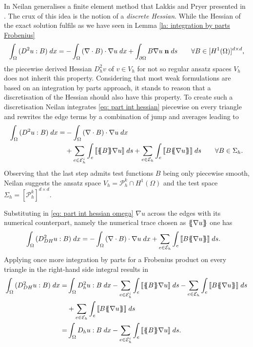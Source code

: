 In \cite{Neilan2014} Neilan generalises a finite element method that Lakkis and Pryer presented in \cite{LP2011}.
The crux of this idea is the notion of a \emph{discrete Hessian}. 
While the Hessian of the exact solution fulfils as we have seen in Lemma \ref{la: integration by parts Frobenius}
	\begin{align}
		\int_{\Omega} {{ (D^2 u : B)}\;dx} = 
			- \int_{\Omega} {{ \left(\nabla \cdot B\right) \cdot \nabla u}\;dx} 
			+ \int_{\partial \Omega} {{B \nabla u \; \mathbf {n}}\;ds} \qquad \forall B \in [H^1(\Omega)]^{d \times d}, \label{eq: part int hessian}
	\end{align}
the piecewise derived Hessian $D_h^2 v$ of $ v \in V_h$ for not so regular ansatz spaces $V_h$ does not inherit this property. Considering that most weak formulations are based on an integration by parts approach, it stands to reason that a discretisation of the Hessian should also have this property. To create such a discretisation Neilan integrates \eqref{eq: part int hessian} piecewise on every triangle and rewrites the edge terms by a combination of jump and averages leading to
	\begin{align}
		\myIntX  \Omega { (D^2 u : B)}
		=& - \myIntX  \Omega { \left(\nabla \cdot B\right) \cdot \nabla u} \nonumber \\
			&+ \sum_{ e \in \edgesi} \myIntS e { \jump {\average B \nabla u }}
			+ \sum_{ e \in \edges} \myIntS e {  \jump{B \average {\nabla u} }}  \qquad \forall B \in \Sigma_h. \label{eq: part int hessian omega}
	\end{align}
Observing that the last step admits test functions $B$ being only piecewise smooth, Neilan suggests the ansatz space $V_h = \mathcal{P}_h^k \cap H^1(\Omega)$ and the test space $\Sigma_h = [\mathcal{P}_h^k]^{d \times d}$.

Substituting in \eqref{eq: part int hessian omega} $\nabla u$ across the edges with its numerical counterpart, namely the numerical trace chosen as $\{\!\!\{ \nabla u \}\!\!\}$ one has
	\begin{align}
		\int_{\Omega} {{ (D_{DH}^2 u : B) }\;dx}
		&= - \int_{\Omega} {{ \left(\nabla \cdot B\right) \cdot \nabla u}\;dx}
				+ \sum_{ e \in \mathcal{E}_h} \int_{e} {{  \llbracket B \{\!\!\{ \nabla u \}\!\!\}  \rrbracket}\;ds}.	
	\end{align}
Applying once more integration by parts for a Frobenius product on every triangle in the right-hand side integral results in
	\begin{align}
		\myIntX  \Omega { (D_{DH}^2 u : B) }
		=& \myIntX  \Omega { D^2_h u: B }
			-\sum_{ e \in \edgesi} \myIntS e {  \jump {\average B  \nabla u }}
			- \sum_{ e \in \edges} \myIntS e { \jump {B \average {\nabla u} }}\nonumber \\		
			&+ \sum_{ e \in \edges} \myIntS e {  \jump {B \average {\nabla u} }}		\nonumber \\
		=& \myIntX  \Omega { D_h u: B}
			 -\sum_{ e \in \edgesi} \myIntS e {  \jump {\average B  \nabla u }	}.
	\end{align}

